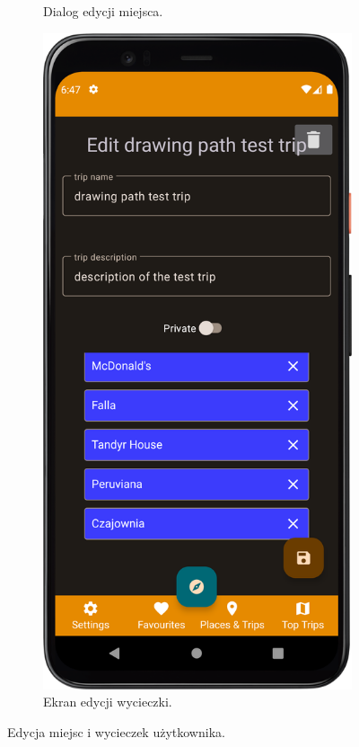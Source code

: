 \begin{figure}[H]
\begin{subfigure}[b]{0.3\textwidth}
                \caption{Dialog edycji miejsca.\label{edit_place}}
            \end{subfigure}
            \hfill
            \begin{subfigure}[b]{0.3\textwidth}
                \centering
                \includegraphics[width=\textwidth]{src/app/edit_trip.png}
                \caption{Ekran edycji wycieczki.\label{edit_trip}}
            \end{subfigure}
            \caption{Edycja miejsc i wycieczek użytkownika.\label{edit}}
            \qquad
        \end{figure} 

